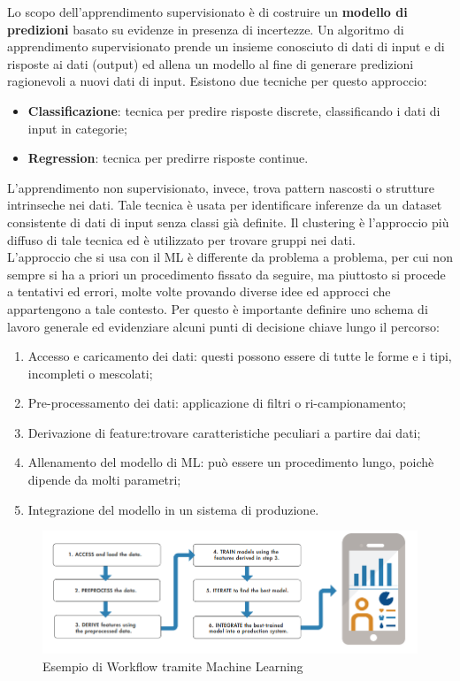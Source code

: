 Lo scopo dell'apprendimento supervisionato è di costruire un \textbf{modello di predizioni} basato su evidenze in presenza di incertezze. Un algoritmo di apprendimento supervisionato prende un insieme conosciuto di dati di input e di risposte ai dati (output) ed allena un modello al fine di generare predizioni ragionevoli a nuovi dati di input. Esistono due tecniche per questo approccio:
\begin{itemize}
	\item \textbf{Classificazione}: tecnica per predire risposte discrete, classificando i dati di input in categorie;
	\item \textbf{Regression}: tecnica per predirre risposte continue.
\end{itemize}
L'apprendimento non supervisionato, invece, trova pattern nascosti o strutture intrinseche nei dati. Tale tecnica è usata per identificare inferenze da un dataset consistente di dati di input senza classi già definite. Il clustering è l'approccio più diffuso di tale tecnica ed è utilizzato per trovare gruppi nei dati.\\
L'approccio che si usa con il ML è differente da problema a problema, per cui non sempre si ha a priori un procedimento fissato da seguire, ma piuttosto si procede a tentativi ed errori, molte volte provando diverse idee ed approcci che appartengono a tale contesto. Per questo è importante definire uno schema di lavoro generale ed evidenziare alcuni punti di decisione chiave lungo il percorso:
\begin{enumerate}
	\item Accesso e caricamento dei dati: questi possono essere di tutte le forme e i tipi, incompleti o mescolati;
	\item Pre-processamento dei dati: applicazione di filtri o ri-campionamento;
	\item Derivazione di feature:trovare caratteristiche peculiari a partire dai dati;
	\item Allenamento del modello di ML: può essere un procedimento lungo, poichè dipende da molti parametri;
	\item Integrazione del modello in un sistema di produzione.
\end{enumerate}
\begin{figure}[]
	\centering
	\includegraphics[scale=0.55]{images/Workflow_ML.png}
	\caption{Esempio di Workflow tramite Machine Learning}
\end{figure}
